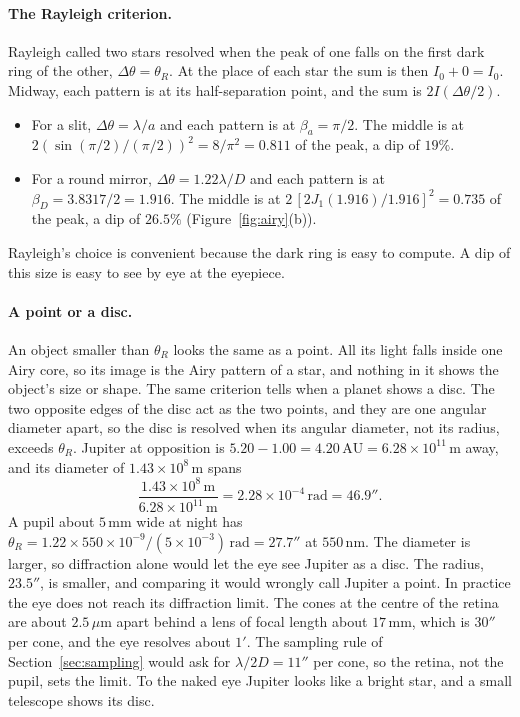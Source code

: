 \paragraph{The Rayleigh criterion.} Rayleigh called two stars resolved when the peak of one falls on the first dark ring of the other, $\Delta\theta=\theta_R$. At the place of each star the sum is then $I_0+0=I_0$. Midway, each pattern is at its half-separation point, and the sum is $2I(\Delta\theta/2)$.
\begin{itemize}
	\item For a slit, $\Delta\theta=\lambda/a$ and each pattern is at $\beta_a=\pi/2$. The middle is at $2(\sin(\pi/2)/(\pi/2))^2=8/\pi^2=0.811$ of the peak, a dip of $19\%$.
	\item For a round mirror, $\Delta\theta=1.22\lambda/D$ and each pattern is at $\beta_D=3.8317/2=1.916$. The middle is at $2\,[2J_1(1.916)/1.916]^2=0.735$ of the peak, a dip of $26.5\%$ (Figure~\ref{fig:airy}(b)).
\end{itemize}
Rayleigh's choice is convenient because the dark ring is easy to compute. A dip of this size is easy to see by eye at the eyepiece.

\paragraph{A point or a disc.} An object smaller than $\theta_R$ looks the same as a point. All its light falls inside one Airy core, so its image is the Airy pattern of a star, and nothing in it shows the object's size or shape. The same criterion tells when a planet shows a disc. The two opposite edges of the disc act as the two points, and they are one angular diameter apart, so the disc is resolved when its angular diameter, not its radius, exceeds $\theta_R$. Jupiter at opposition is $5.20-1.00=4.20\,\mathrm{AU}=6.28\times10^{11}\,\mathrm m$ away, and its diameter of $1.43\times10^8\,\mathrm m$ spans
\[
\frac{1.43\times10^{8}\,\mathrm m}{6.28\times10^{11}\,\mathrm m}=2.28\times10^{-4}\,\mathrm{rad}=46.9'' .
\]
A pupil about $5\,\mathrm{mm}$ wide at night has $\theta_R=1.22\times550\times10^{-9}/(5\times10^{-3})\,\mathrm{rad}=27.7''$ at $550\,\mathrm{nm}$. The diameter is larger, so diffraction alone would let the eye see Jupiter as a disc. The radius, $23.5''$, is smaller, and comparing it would wrongly call Jupiter a point. In practice the eye does not reach its diffraction limit. The cones at the centre of the retina are about $2.5\,\mu\mathrm m$ apart behind a lens of focal length about $17\,\mathrm{mm}$, which is $30''$ per cone, and the eye resolves about $1'$. The sampling rule of Section~\ref{sec:sampling} would ask for $\lambda/2D=11''$ per cone, so the retina, not the pupil, sets the limit. To the naked eye Jupiter looks like a bright star, and a small telescope shows its disc.


